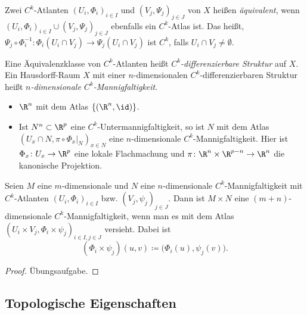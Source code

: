 \documentclass[11pt]{article}
\begin{document}
\begin{definition}\Theorem
  Zwei $C^k$-Atlanten $(U_i, \Phi_i)_{i \in I}$ und $(V_j, \Psi_j)_{j \in J}$ von $X$ heißen \emph{äquivalent}, wenn $(U_i, \Phi_i)_{i \in I} \cup (V_j, \Psi_j)_{j \in J}$ ebenfalls ein $C^k$-Atlas ist.
  Das heißt, $\Psi_j \circ \Phi_i^{-1}\colon \Phi_i(U_i \cap V_j) \to \Psi_j(U_i \cap V_j)$ ist $C^k$, falls $U_i \cap V_j \neq \emptyset$.
\end{definition}

\begin{definition}\Theorem
  Eine Äquivalenzklasse von $C^k$-Atlanten heißt \emph{$C^k$-differenzierbare Struktur} auf $X$.
  Ein Hausdorff-Raum $X$ mit einer $n$-dimensionalen $C^k$-differenzierbaren Struktur heißt \emph{$n$-dimensionale $C^k$-Mannigfaltigkeit}.
\end{definition}

\begin{example}
  \begin{itemize}
    \item $\R^n$ mit dem Atlas $\{(\R^n, \id)\}$.
    \item Ist $N^n \subset \R^p$ eine $C^k$-Untermannigfaltigkeit, so ist $N$ mit dem Atlas $(U_x \cap N, \pi \circ \Phi_x|_N)_{x \in N}$ eine $n$-dimensionale $C^k$-Mannigfaltigkeit. Hier ist $\Phi_x\colon U_x \to \R^p$ eine lokale Flachmachung und $\pi\colon \R^n \times \R^{p-n} \to \R^n$ die kanonische Projektion.
  \end{itemize}
\end{example}


\begin{proposition}[Produktmannigfaltigkeit]\Theorem
  Seien $M$ eine $m$-dimensionale und $N$ eine $n$-dimensionale $C^k$-Mannigfaltigkeit mit $C^k$-Atlanten $(U_i, \Phi_i)_{i \in I}$ bzw. $(V_j, \psi_j)_{j \in J}$. Dann ist $M \times N$ eine $(m+n)$-dimensionale $C^k$-Mannigfaltigkeit, wenn man es mit dem Atlas $(U_i \times V_j, \Phi_i \times \psi_j)_{i \in I, j \in J}$ versieht. Dabei ist
  \[ (\Phi_i \times \psi_j)(u, v) \coloneqq \bigl(\Phi_i(u), \psi_j(v)\bigr). \]
\end{proposition}

\begin{proof}
  Übungsaufgabe.
\end{proof}

\subsection{Topologische Eigenschaften}
\end{document}
